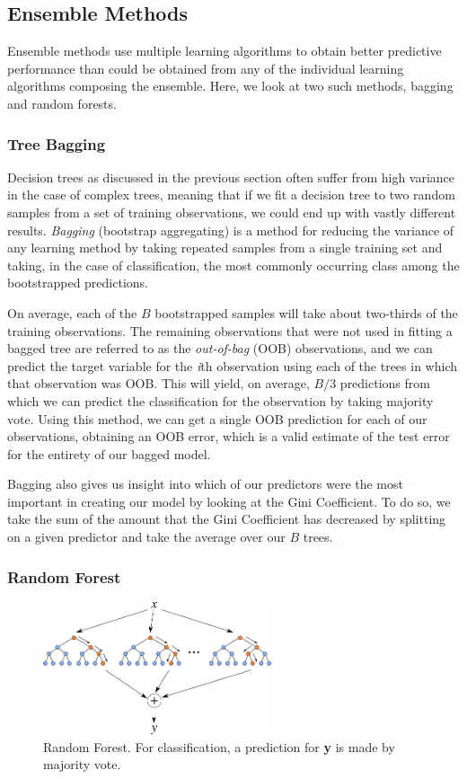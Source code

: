 \documentclass[preprint,12pt]{elsarticle}
\begin{document}
\subsection{Ensemble Methods}
Ensemble methods use multiple learning algorithms to obtain better predictive performance than could be obtained from any of the individual learning algorithms composing the ensemble. Here, we look at two such methods, bagging and random forests.


\subsubsection{Tree Bagging}
Decision trees as discussed in the previous section often suffer from high variance in the case of complex trees, meaning that if we fit a decision tree to two random samples from a set of training observations, we could end up with vastly different results\cite{ESL}. \textit{Bagging} (bootstrap aggregating) is a method for reducing the variance of any learning method by taking repeated samples from a single training set and taking, in the case of classification, the most commonly occurring class among the bootstrapped predictions. 

On average, each of the $B$ bootstrapped samples will take about two-thirds of the training observations.  The remaining observations that were not used in fitting a bagged tree are referred to as the \textit{out-of-bag} (OOB) observations, and we can predict the target variable for the \textit{i}th observation using each of the trees in which that observation was OOB. This will yield, on average, $B/3$ predictions from which we can predict the classification for the observation by taking majority vote.\cite{ISLR} Using this method, we can get a single OOB prediction for each of our observations, obtaining an OOB error, which is a valid estimate of the test error for the entirety of our bagged model.

Bagging also gives us insight into which of our predictors were the most important in creating our model by looking at the Gini Coefficient. To do so, we take the sum of the amount that the Gini Coefficient has decreased by splitting on a given predictor and take the average over our $B$ trees.

\subsubsection{Random Forest}


\begin{figure}[h]
	\centering
	\includegraphics[width=0.6\textwidth]{RF}
	\caption{Random Forest. For classification, a prediction for \textbf{y} is made by majority vote.}
\end{figure}
\end{document}
